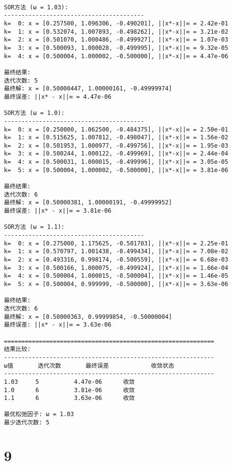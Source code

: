 \documentclass[11pt]{article}
\begin{document}
    \begin{Verbatim}[commandchars=\\\{\}]

SOR方法 (ω = 1.03):
----------------------------------------
k=  0: x = [0.257500, 1.096306, -0.490201], ||x*-x||∞ = 2.42e-01
k=  1: x = [0.532074, 1.007893, -0.498262], ||x*-x||∞ = 3.21e-02
k=  2: x = [0.501070, 1.000486, -0.499927], ||x*-x||∞ = 1.07e-03
k=  3: x = [0.500093, 1.000028, -0.499995], ||x*-x||∞ = 9.32e-05
k=  4: x = [0.500004, 1.000002, -0.500000], ||x*-x||∞ = 4.47e-06

最终结果:
迭代次数: 5
最终解: x = [0.50000447, 1.00000161, -0.49999974]
最终误差: ||x* - x||∞ = 4.47e-06

SOR方法 (ω = 1.0):
----------------------------------------
k=  0: x = [0.250000, 1.062500, -0.484375], ||x*-x||∞ = 2.50e-01
k=  1: x = [0.515625, 1.007812, -0.498047], ||x*-x||∞ = 1.56e-02
k=  2: x = [0.501953, 1.000977, -0.499756], ||x*-x||∞ = 1.95e-03
k=  3: x = [0.500244, 1.000122, -0.499969], ||x*-x||∞ = 2.44e-04
k=  4: x = [0.500031, 1.000015, -0.499996], ||x*-x||∞ = 3.05e-05
k=  5: x = [0.500004, 1.000002, -0.500000], ||x*-x||∞ = 3.81e-06

最终结果:
迭代次数: 6
最终解: x = [0.50000381, 1.00000191, -0.49999952]
最终误差: ||x* - x||∞ = 3.81e-06

SOR方法 (ω = 1.1):
----------------------------------------
k=  0: x = [0.275000, 1.175625, -0.501703], ||x*-x||∞ = 2.25e-01
k=  1: x = [0.570797, 1.001438, -0.499434], ||x*-x||∞ = 7.08e-02
k=  2: x = [0.493316, 0.998174, -0.500559], ||x*-x||∞ = 6.68e-03
k=  3: x = [0.500166, 1.000075, -0.499924], ||x*-x||∞ = 1.66e-04
k=  4: x = [0.500004, 1.000015, -0.500004], ||x*-x||∞ = 1.46e-05
k=  5: x = [0.500004, 0.999999, -0.500000], ||x*-x||∞ = 3.63e-06

最终结果:
迭代次数: 6
最终解: x = [0.50000363, 0.99999854, -0.50000004]
最终误差: ||x* - x||∞ = 3.63e-06

============================================================
结果比较:
------------------------------------------------------------
ω值       迭代次数       最终误差            收敛状态
------------------------------------------------------------
1.03     5          4.47e-06      收敛
1.0      6          3.81e-06      收敛
1.1      6          3.63e-06      收敛

最优松弛因子: ω = 1.03
最少迭代次数: 5
    \end{Verbatim}

    \section{9}\label{section}
\end{document}
